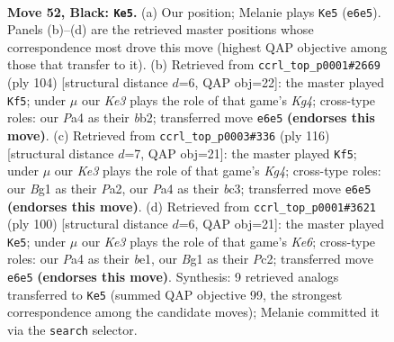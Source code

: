 \documentclass[11pt]{article}
\begin{document}
\clearpage

\begin{figure}[p]\centering
\begin{subfigure}{0.46\textwidth}\centering
\resizebox{\linewidth}{!}{%
\newchessgame
\chessboard[
  setfen={8/7K/4k1p1/6P1/p7/3b4/8/6b1 b - - 11 52},
  showmover=false,
  pgfstyle=straightmove, color=movearrow, markmove={e6-e5}
]}
\caption{}
\end{subfigure}\hfill
\begin{subfigure}{0.46\textwidth}\centering
\resizebox{\linewidth}{!}{%
\newchessgame
\chessboard[
  setfen={8/8/3k4/3P4/p5K1/8/Bb6/8 w - - 1 53},
  showmover=false,
  pgfstyle=straightmove, color=movearrow, markmove={g4-f5}
]}
\caption{}
\end{subfigure}
\\[4pt]
\begin{subfigure}{0.46\textwidth}\centering
\resizebox{\linewidth}{!}{%
\newchessgame
\chessboard[
  setfen={8/8/3kP3/8/p1B3K1/2b5/P7/8 w - - 4 59},
  showmover=false,
  pgfstyle=straightmove, color=movearrow, markmove={g4-f5}
]}
\caption{}
\end{subfigure}\hfill
\begin{subfigure}{0.46\textwidth}\centering
\resizebox{\linewidth}{!}{%
\newchessgame
\chessboard[
  setfen={8/8/1Pk1K3/8/2pB4/8/2P5/4b3 w - - 3 51},
  showmover=false,
  pgfstyle=straightmove, color=movearrow, markmove={e6-e5}
]}
\caption{}
\end{subfigure}
\caption{\textbf{Move 52, Black: \texttt{Ke5}.} (a) Our position; Melanie plays \texttt{Ke5} (\texttt{e6e5}). Panels (b)--(d) are the retrieved master positions whose correspondence most drove this move (highest QAP objective among those that transfer to it). (b) Retrieved from \texttt{ccrl\_top\_p0001\#2669} (ply 104) [structural distance $d$=6, QAP obj=22]: the master played \texttt{Kf5}; under $\mu$ our \emph{Ke3} plays the role of that game's \emph{Kg4}; cross-type roles: our \emph{P}a4 as their \emph{b}b2; transferred move \texttt{e6e5} \textbf{(endorses this move)}. (c) Retrieved from \texttt{ccrl\_top\_p0003\#336} (ply 116) [structural distance $d$=7, QAP obj=21]: the master played \texttt{Kf5}; under $\mu$ our \emph{Ke3} plays the role of that game's \emph{Kg4}; cross-type roles: our \emph{B}g1 as their \emph{P}a2, our \emph{P}a4 as their \emph{b}c3; transferred move \texttt{e6e5} \textbf{(endorses this move)}. (d) Retrieved from \texttt{ccrl\_top\_p0001\#3621} (ply 100) [structural distance $d$=6, QAP obj=21]: the master played \texttt{Ke5}; under $\mu$ our \emph{Ke3} plays the role of that game's \emph{Ke6}; cross-type roles: our \emph{P}a4 as their \emph{b}e1, our \emph{B}g1 as their \emph{P}c2; transferred move \texttt{e6e5} \textbf{(endorses this move)}. Synthesis: 9 retrieved analogs transferred to \texttt{Ke5} (summed QAP objective 99, the strongest correspondence among the candidate moves); Melanie committed it via the \texttt{search} selector.}
\label{fig:thought-m103}
\end{figure}
\end{document}
